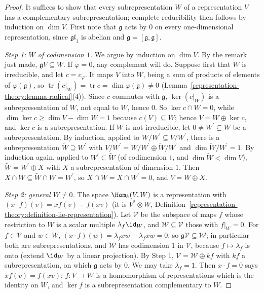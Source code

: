 \begin{proof}
It suffices to show that every subrepresentation $W$ of a representation $V$ has a complementary subrepresentation; complete reducibility then follows by induction on $\dim V$. First
note that $\mathfrak{g}$ acts by $0$ on every one-dimensional representation, since $\mathfrak{gl}_1$ is abelian and $\mathfrak{g} = [\mathfrak{g}, \mathfrak{g}]$.

\emph{Step 1: $W$ of codimension $1$.} We argue by induction on $\dim V$. By the remark just made, $\mathfrak{g}V \subseteq W$. If $\varphi = 0$, any complement will do. Suppose first
that $W$ is irreducible, and let $c = c_\varphi$. It maps $V$ into $W$, being a sum of products of elements of $\varphi(\mathfrak{g})$, so
$\operatorname{tr}(c|_W) = \operatorname{tr}c = \dim\varphi(\mathfrak{g}) \neq 0$ (Lemma~\ref{representation-theory:lemma-radical}(4)). Since $c$ commutes with $\mathfrak{g}$,
$\ker(c|_W)$ is a subrepresentation of $W$, not equal to $W$, hence $0$. So $\ker c \cap W = 0$, while $\dim\ker c \geq \dim V - \dim W = 1$ because $c(V) \subseteq W$; hence
$V = W \oplus \ker c$, and $\ker c$ is a subrepresentation. If $W$ is not irreducible, let $0 \neq W^{\prime} \subsetneq W$ be a subrepresentation. By induction, applied to
$W/W^{\prime} \subseteq V/W^{\prime}$, there is a subrepresentation $\widetilde{W} \supseteq W^{\prime}$ with $V/W^{\prime} = W/W^{\prime} \oplus \widetilde{W}/W^{\prime}$ and
$\dim\widetilde{W}/W^{\prime} = 1$. By induction again, applied to $W^{\prime} \subseteq \widetilde{W}$ (of codimension $1$, and $\dim\widetilde{W} < \dim V$),
$\widetilde{W} = W^{\prime} \oplus X$ with $X$ a subrepresentation of dimension $1$. Then $X \cap W \subseteq \widetilde{W} \cap W = W^{\prime}$, so $X \cap W = X \cap W^{\prime} = 0$,
and $V = W \oplus X$.

\emph{Step 2: general $W \neq 0$.} The space $\Hom_k(V, W)$ is a representation with $(x \cdot f)(v) = xf(v) - f(xv)$ (it is $V^* \otimes W$,
Definition~\ref{representation-theory:definition-lie-representation}). Let $\mathcal{V}$ be the subspace of maps $f$ whose restriction to $W$ is a scalar multiple $\lambda_f\id_W$,
and $\mathcal{W} \subseteq \mathcal{V}$ those with $f|_W = 0$. For $f \in \mathcal{V}$ and $w \in W$, $(x \cdot f)(w) = \lambda_fxw - \lambda_fxw = 0$, so
$\mathfrak{g}\mathcal{V} \subseteq \mathcal{W}$; in particular both are subrepresentations, and $\mathcal{W}$ has codimension $1$ in $\mathcal{V}$, because $f \mapsto \lambda_f$ is onto
(extend $\id_W$ by a linear projection). By Step 1, $\mathcal{V} = \mathcal{W} \oplus kf$ with $kf$ a subrepresentation, on which $\mathfrak{g}$ acts by $0$. We may take
$\lambda_f = 1$. Then $x \cdot f = 0$ says $xf(v) = f(xv)$: $f \colon V \to W$ is a homomorphism of representations which is the identity on $W$, and $\ker f$ is a
subrepresentation complementary to $W$.
\end{proof}

